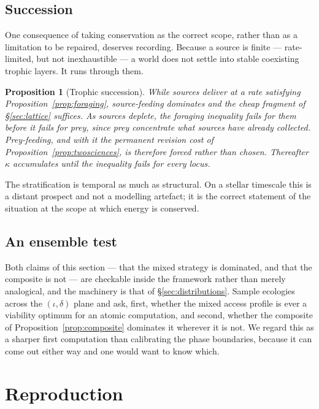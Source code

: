 \documentclass[11pt]{article}
\theoremstyle{plain}
\newtheorem{proposition}[theorem]{Proposition}
\theoremstyle{definition}
\begin{document}
\subsection{Succession}

One consequence of taking conservation as the correct scope, rather than as a limitation to be
repaired, deserves recording. Because a source is finite --- rate-limited, but not inexhaustible --- a
world does not settle into stable coexisting trophic layers. It runs through them.

\begin{proposition}[Trophic succession]
\label{prop:succession}
While sources deliver at a rate satisfying Proposition~\ref{prop:foraging}, source-feeding dominates
and the cheap fragment of \S\ref{sec:lattice} suffices. As sources deplete, the foraging inequality
fails for them before it fails for prey, since prey concentrate what sources have already collected.
Prey-feeding, and with it the permanent revision cost of
Proposition~\ref{prop:twosciences}, is therefore forced rather than chosen. Thereafter $\kappa$
accumulates until the inequality fails for every locus.
\end{proposition}

The stratification is temporal as much as structural. On a stellar timescale this is a distant
prospect and not a modelling artefact; it is the correct statement of the situation at the scope at
which energy is conserved.

\subsection{An ensemble test}

Both claims of this section --- that the mixed strategy is dominated, and that the composite is not
--- are checkable inside the framework rather than merely analogical, and the machinery is that of
\S\ref{sec:distributions}. Sample ecologies across the $(\iota, \delta)$ plane and ask, first, whether
the mixed access profile is ever a viability optimum for an atomic computation, and second, whether the
composite of Proposition~\ref{prop:composite} dominates it wherever it is not. We regard this as a
sharper first computation than calibrating the phase boundaries, because it can come out either way
and one would want to know which.

\section{Reproduction}
\label{sec:repro}
\end{document}
